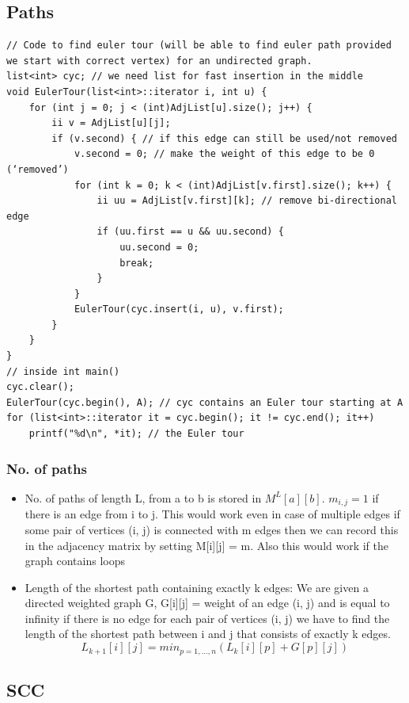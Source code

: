 \documentclass[8pt, a4paper, oneside, twocolumn]{extarticle}
\begin{document}
\subsection{Paths}
\begin{verbatim}
// Code to find euler tour (will be able to find euler path provided we start with correct vertex) for an undirected graph.
list<int> cyc; // we need list for fast insertion in the middle
void EulerTour(list<int>::iterator i, int u) {
    for (int j = 0; j < (int)AdjList[u].size(); j++) {
        ii v = AdjList[u][j];
        if (v.second) { // if this edge can still be used/not removed
            v.second = 0; // make the weight of this edge to be 0 (‘removed’)
            for (int k = 0; k < (int)AdjList[v.first].size(); k++) {
                ii uu = AdjList[v.first][k]; // remove bi-directional edge
                if (uu.first == u && uu.second) {
                    uu.second = 0;
                    break;
                } 
            }
            EulerTour(cyc.insert(i, u), v.first);
        } 
    }
}
// inside int main()
cyc.clear();
EulerTour(cyc.begin(), A); // cyc contains an Euler tour starting at A
for (list<int>::iterator it = cyc.begin(); it != cyc.end(); it++)
    printf("%d\n", *it); // the Euler tour
\end{verbatim}
\subsubsection{No. of paths}
\begin{itemize}
    \item No. of paths of length L, from a to b is stored in $M^L[a][b]$. $m_{i, j} = 1$ if there is an edge from i to j. This would work even in case of multiple edges if some pair of vertices (i, j) is connected with m edges then we can record this in the adjacency matrix by setting M[i][j] = m. Also this would work if the graph contains loops 
    \item Length of the shortest path containing exactly k edges: We are given a directed weighted graph G, G[i][j] = weight of an edge (i, j) and is equal to infinity if there is no edge for each pair of vertices (i, j) we have to find the length of the shortest path between i and j that consists of exactly k edges. $$L_{k + 1}[i][j] = min_{p = 1, \dots, n}(L_k[i][p] + G[p][j])$$
\end{itemize}
\subsection{SCC}
\end{document}
